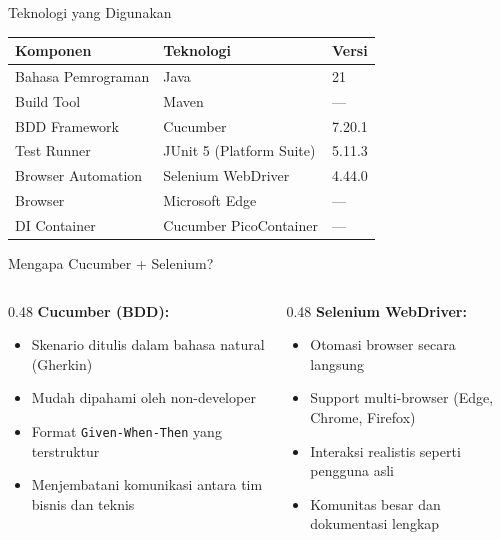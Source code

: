 \documentclass[aspectratio=169]{beamer}
\begin{document}
\begin{frame}{Teknologi yang Digunakan}
  \begin{table}[h]
    \centering
    \begin{tabular}{lll}
      \toprule
      \textbf{Komponen} & \textbf{Teknologi} & \textbf{Versi} \\
      \midrule
      Bahasa Pemrograman & Java               & 21      \\
      Build Tool         & Maven              & —       \\
      BDD Framework      & Cucumber           & 7.20.1  \\
      Test Runner        & JUnit 5 (Platform Suite) & 5.11.3 \\
      Browser Automation & Selenium WebDriver & 4.44.0  \\
      Browser            & Microsoft Edge     & —       \\
      DI Container       & Cucumber PicoContainer & —   \\
      \bottomrule
    \end{tabular}
  \end{table}
\end{frame}

\begin{frame}{Mengapa Cucumber + Selenium?}
  \begin{columns}[T]
    \begin{column}{0.48\textwidth}
      \textbf{Cucumber (BDD):}
      \begin{itemize}
        \item Skenario ditulis dalam bahasa natural (Gherkin)
        \item Mudah dipahami oleh non-developer
        \item Format \texttt{Given-When-Then} yang terstruktur
        \item Menjembatani komunikasi antara tim bisnis dan teknis
      \end{itemize}
    \end{column}
    \begin{column}{0.48\textwidth}
      \textbf{Selenium WebDriver:}
      \begin{itemize}
        \item Otomasi browser secara langsung
        \item Support multi-browser (Edge, Chrome, Firefox)
        \item Interaksi realistis seperti pengguna asli
        \item Komunitas besar dan dokumentasi lengkap
      \end{itemize}
    \end{column}
  \end{columns}
\end{frame}
\end{document}
